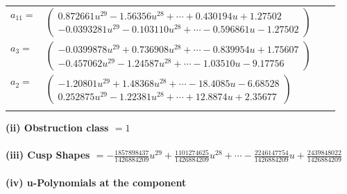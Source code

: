\documentclass[1p]{elsarticle_modified}
\theoremstyle{definition}
\begin{document}
\begin{tabular}{m{7pt} m{180pt} m{7pt} m{180pt} }
\flushright $a_{11}=$&$\begin{pmatrix}0.872661 u^{29}-1.56356 u^{28}+\cdots+0.430194 u+1.27502\\-0.0393281 u^{29}-0.103110 u^{28}+\cdots-0.596861 u-1.27502\end{pmatrix}$ \\
\flushright $a_{3}=$&$\begin{pmatrix}-0.0399878 u^{29}+0.736908 u^{28}+\cdots-0.839954 u+1.75607\\-0.457062 u^{29}-1.24587 u^{28}+\cdots-1.03510 u-9.17756\end{pmatrix}$ \\
\flushright $a_{2}=$&$\begin{pmatrix}-1.20801 u^{29}+1.48368 u^{28}+\cdots-18.4085 u-6.68528\\0.252875 u^{29}-1.22381 u^{28}+\cdots+12.8874 u+2.35677\end{pmatrix}$\\&\end{tabular}
\flushleft \textbf{(ii) Obstruction class $= 1$}\\~\\
\flushleft \textbf{(iii) Cusp Shapes $= -\frac{1857898437}{1426884209} u^{29}+\frac{1101274625}{1426884209} u^{28}+\cdots-\frac{2246147754}{1426884209} u+\frac{2439848022}{1426884209}$}\\~\\
\newpage\renewcommand{\arraystretch}{1}
\flushleft \textbf{(iv) u-Polynomials at the component}\newline \\
\end{document}
